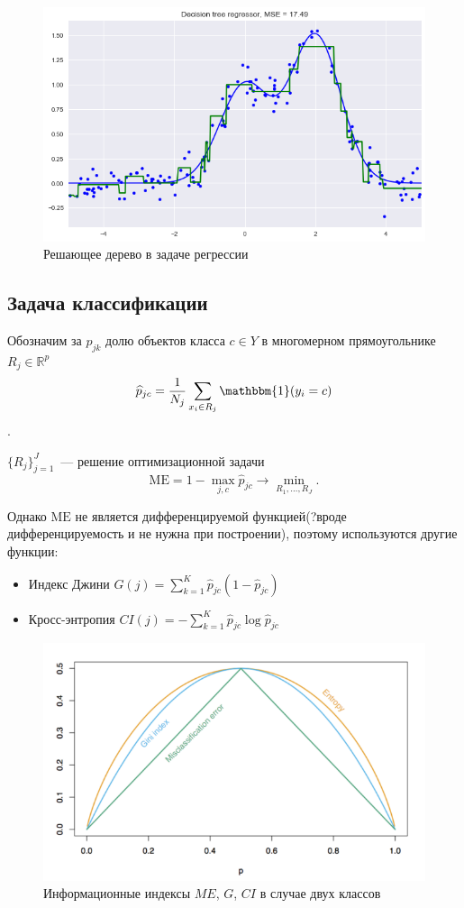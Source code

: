 \documentclass{article}
\theoremstyle{definition}
\theoremstyle{theorem}
\theoremstyle{remark}
\theoremstyle{theorem}
\theoremstyle{example}
\theoremstyle{theorem}
\theoremstyle{theorem}
\theoremstyle{theorem}
\theoremstyle{theorem}
\begin{document}
		\begin{figure}[h!]
			\includegraphics[width=\textwidth]{reg_tree}\caption{Решающее дерево в задаче регрессии}
		\end{figure}
	\subsection{Задача классификации}
		Обозначим за $p_{jk}$ долю объектов класса $c\in Y$ в многомерном прямоугольнике $R_j\in\mathbb R^p$ $$\widehat p_{jc}=\frac1{N_j}\sum\limits_{x_i\in R_j}\mathbbm{1}(y_i=c)$$.
		
		$\{R_j\}_{j=1}^J$~--- решение оптимизационной задачи $$\mathrm{ME}=1-\max_{j,c}\widehat p_{jc}\to\min\limits_{R_1,\ldots,R_J}.$$
		
		Однако $\mathrm{ME}$ не является дифференцируемой функцией(?вроде дифференцируемость и не нужна при построении), поэтому используются другие функции:
		\begin{itemize}
			\item Индекс Джини $G(j)=\sum\limits_{k=1}^K\widehat p_{jc}(1-\widehat p_{jc})$
			\item Кросс-энтропия $CI(j)=-\sum\limits_{k=1}^K\widehat p_{jc}\log\widehat p_{jc}$
		\end{itemize}
		
		\begin{figure}[h!]
		\includegraphics[width=\textwidth]{entr}\caption{Информационные индексы $ME$, $G$, $CI$ в случае двух классов}		
		\end{figure}
		
\end{document}
